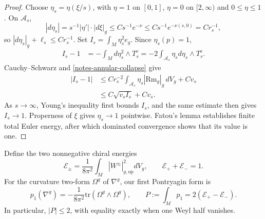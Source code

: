 \documentclass[letterpaper]{amsart}
\theoremstyle{definition}
\theoremstyle{remark}
\def\tr{\mathrm{tr}}
\def\Rm{\mathrm{Rm}}
\begin{document}
\begin{proof}
Choose $\eta_s=\eta(\xi/s)$, with $\eta=1$ on $[0,1]$, $\eta=0$ on
$[2,\infty)$ and $0\le\eta\le1$. On $\mathcal A_s$, 
$$|d \eta _s| = s ^{-1}|\eta '| \cdot |d \xi |_g \leq C s ^{-1} e ^{- \nu } \leq C s ^{-1} e ^{- \nu (s,0)} = C r_s ^{-1},$$
so $|d\eta_s|_g+\ell_s\le Cr_s ^{-1}$.
Set $I_s=\int_M\eta_s^2e_g$. Since $\eta _s(p) =1$,
\begin{align*}
	I_s - 1 &= - \int_{M} d \eta _s ^2 \wedge T ^{e}_{s} = -2 \int_{\mathcal{A}_s} \eta _s d \eta _s \wedge T^e_{s}.
\end{align*} 
Cauchy--Schwarz and \eqref{notes-annular-collapse} give
\begin{align*}
 |I_s-1|
 &\le Cr_s^{-2}\int_{\mathcal A_s}\eta_s|\Rm_g|_g\,dV_g+Cv_s\\
 &\le C\sqrt{v_s I_s}+Cv_s.
\end{align*}
As $s\to \infty$,
Young's inequality first bounds $I_s$, and the same estimate then gives
$I_s\to1$. Properness of $\xi$ gives $\eta_s\to1$ pointwise. Fatou's lemma
establishes finite total Euler energy, after which dominated convergence
shows that its value is one.
\end{proof}

Define the two nonnegative chiral energies
\[
 \mathcal E_\pm=\frac1{8\pi^2}\int_M|W^\pm|_{g,\mathrm{op}}^2dV_g,
 \qquad \mathcal E_++\mathcal E_-=1.
\]
For the curvature two-form $\Omega^g$ of $\nabla^g$, our first Pontryagin form is
\[
 p_1(\nabla^g)=-\frac1{8\pi^2}\tr(\Omega^g\wedge\Omega^g),\qquad
 P:=\int_Mp_1=2(\mathcal E_+-\mathcal E_-).
\]
In particular, $|P|\le2$, with equality exactly when one Weyl half vanishes.
\end{document}
